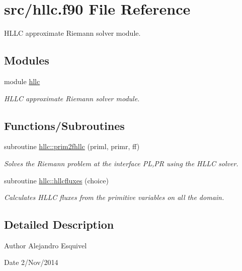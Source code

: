 \hypertarget{hllc_8f90}{}\section{src/hllc.f90 File Reference}
\label{hllc_8f90}


H\+L\+L\+C approximate Riemann solver module.  


\subsection*{Modules}
\begin{DoxyCompactItemize}
\item 
module \hyperlink{namespacehllc}{hllc}
\begin{DoxyCompactList}\small\item\em H\+L\+L\+C approximate Riemann solver module. \end{DoxyCompactList}\end{DoxyCompactItemize}
\subsection*{Functions/\+Subroutines}
\begin{DoxyCompactItemize}
\item 
subroutine \hyperlink{namespacehllc_a25f1f218ed55fbda8b6311baa3ff6f80}{hllc\+::prim2fhllc} (priml, primr, ff)
\begin{DoxyCompactList}\small\item\em Solves the Riemann problem at the interface P\+L,P\+R using the H\+L\+L\+C solver. \end{DoxyCompactList}\item 
subroutine \hyperlink{namespacehllc_a702fd4ba2d419a6ac6d21a9bc25ba230}{hllc\+::hllcfluxes} (choice)
\begin{DoxyCompactList}\small\item\em Calculates H\+L\+L\+C fluxes from the primitive variables on all the domain. \end{DoxyCompactList}\end{DoxyCompactItemize}


\subsection{Detailed Description}
\begin{DoxyAuthor}{Author}
Alejandro Esquivel 
\end{DoxyAuthor}
\begin{DoxyDate}{Date}
2/\+Nov/2014 
\end{DoxyDate}
